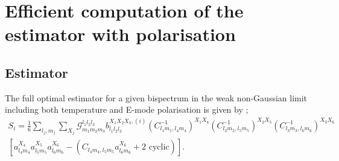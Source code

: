 \documentclass[a4paper,12pt,times,custombib,print,index]{Classes/PhDThesisPSnPDF} %
\begin{document}
\section{Efficient computation of the estimator with polarisation} \label{section: Efficient computation of KSW estimator with polarisation}

\subsection{Estimator}

The full optimal estimator for a given bispectrum in the weak non-Gaussian limit including both temperature and E-mode polarisation is given by \cite{Komatsu2005,Komatsu2010};
\begin{eqnarray}
	S_i =  \frac{1}{6} \sum_{l_j, m_j} \sum_{X_j} \mathcal{G}_{m_1 m_2 m_3}^{l_1 l_2 l_3} b_{l_1 l_2 l_3} ^{X_1 X_2 X_3, (i)} (C_{l_1 m_1, l_4 m_4}^{-1})^{X_1 X_4} (C_{l_2 m_2, l_5 m_5}^{-1})^{X_2 X_5} (C_{l_3 m_3, l_6 m_6}^{-1})^{X_3 X_6} \nonumber \\  \left[ a_{l_4 m_4}^{X_4} a_{l_5 m_5}^{X_5} a_{l_6 m_6}^{X_6} -  \left( C_{l_4 m_4, l_5 m_5} a_{l_6 m_6}^{X_6} + \text{2 cyclic} \right)   \right].
	\label{Estimator full definition}
\end{eqnarray}
\end{document}
